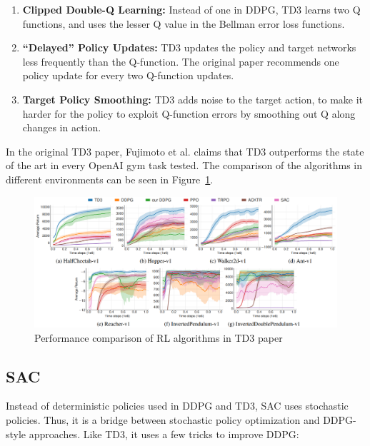 \documentclass[12pt,twoside]{report}
\begin{document}
\begin{enumerate}
  \item \textbf{Clipped Double-Q Learning:} Instead of one in DDPG, TD3 learns two Q functions, and uses the lesser Q value in the Bellman error loss functions.
  \item \textbf{“Delayed” Policy Updates:} TD3 updates the policy and target networks less frequently than the Q-function. The original paper recommends one policy update for every two Q-function updates.
  \item \textbf{Target Policy Smoothing:} TD3 adds noise to the target action, to make it harder for the policy to exploit Q-function errors by smoothing out Q along changes in action.
\end{enumerate}

In the original TD3 paper, Fujimoto et al. claims that TD3 outperforms the state of the art in every OpenAI gym task tested. \cite{td3} The comparison of the algorithms in different environments can be seen in Figure~\ref{fig:td3-comparisons}.

\begin{figure}[h]
\centering
\includegraphics[width = \hsize]{figures/td3 comparison.png}
\caption{Performance comparison of RL algorithms in TD3 paper \cite{td3}}
\label{fig:td3-comparisons}
\end{figure}


\subsection{SAC}
Instead of deterministic policies used in DDPG and TD3, SAC uses stochastic policies. Thus, it is a bridge between stochastic policy optimization and DDPG-style approaches. Like TD3, it uses a few tricks to improve DDPG: \cite{openai:sac}
\end{document}
